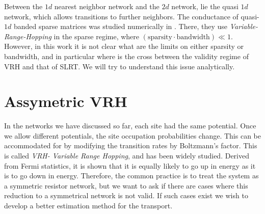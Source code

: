 
Between the $1d$ nearest neighbor network and the $2d$ network,
lie the quasi $1d$ network, which allows transitions to further neighbors.
The conductance of quasi-$1d$ banded sparse matrices was studied numerically in \cite{stotland_random-matrix_2010}. There, they use \emph{Variable-Range-Hopping} in the sparse regime, where 
$(\text{sparsity}\cdot \text{bandwidth}) \ll 1$. 
However, in this work it is not clear what are the limits on either sparsity or bandwidth, and in particular where is the cross between the validity regime of VRH and that of SLRT. We will try to understand this issue analytically.



\section{Assymetric VRH}





In the networks we have discussed so far, each site had the same potential. Once
we allow different potentials, the site occupation probabilities change.
This can be accommodated for by modifying the transition rates by Boltzmann's factor. This is called \emph{VRH- Variable Range Hopping}\cite{ambegaokar_hopping_1971}, and has been widely studied. 
Derived from Fermi statistics, it is shown that it is equally likely to go up in energy as it is to go down in energy.
Therefore, the common practice is to treat the system as a symmetric resistor network,
but we want to ask if there are cases where this reduction to a symmetrical network is not valid.
If such cases exist we wish to develop a better estimation method for the transport. 


